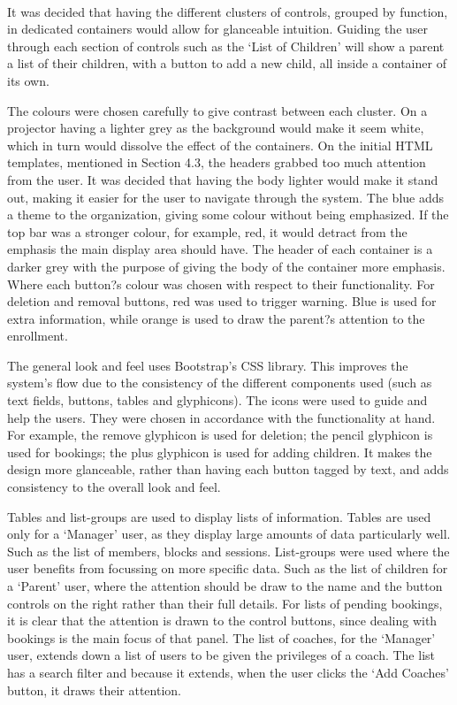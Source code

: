 \documentclass{l3proj}
\begin{document}
\\
\par It was decided that having the different clusters of controls, grouped by function, in dedicated containers would allow for glanceable intuition. Guiding the user through each section of controls such as the `List of Children' will show a parent a list of their children, with a button to add a new child, all inside a container of its own.\\
\par The colours were chosen carefully to give contrast between each cluster. On a projector having a lighter grey as the background would make it seem white, which in turn would dissolve the effect of the containers. On the initial HTML templates, mentioned in Section 4.3, the headers grabbed too much attention from the user. It was decided that having the body lighter would make it stand out, making it easier for the user to navigate through the system. The blue adds a theme to the organization, giving some colour without being emphasized. If the top bar was a stronger colour,  for example, red, it would detract from the emphasis the main display area should have. The header of each container is a darker grey with the purpose of giving the body of the container more emphasis. Where each button?s colour was chosen with respect to their functionality. For deletion and removal buttons, red was used to trigger warning. Blue is used for extra information, while orange is used to draw the parent?s attention to the enrollment. \\
\par The general look and feel uses Bootstrap's CSS library. This improves the system's flow due to the consistency of the different components used (such as text fields, buttons, tables and glyphicons). The icons were used to guide and help the users. They were chosen in accordance with the functionality at hand. For example, the remove glyphicon is used for deletion; the pencil glyphicon is used for bookings; the plus glyphicon is used for adding children. It makes the design more glanceable, rather than having each button tagged by text, and adds consistency to the overall look and feel.\\
\par Tables and list-groups are used to display lists of information. Tables are used only for a `Manager' user, as they display large amounts of data particularly well. Such as the list of members, blocks and sessions. List-groups were used where the user benefits from focussing on more specific data. Such as the list of children for a `Parent' user, where the attention should be draw to the name and the button controls on the right rather than their full details. For lists of pending bookings, it is clear that the attention is drawn to the control buttons, since dealing with bookings is the main focus of that panel. The list of coaches, for the `Manager' user, extends down a list of users to be given the privileges of a coach. The list has a search filter and because it extends, when the user clicks the `Add Coaches' button, it draws their attention.
\end{document}
